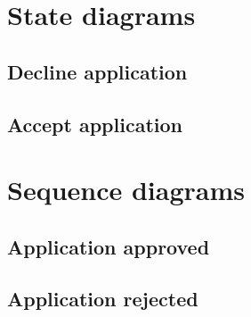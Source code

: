 \section{State diagrams}

\subsection{Decline application}

\subsection{Accept application}

\section{Sequence diagrams}

\subsection{Application approved}

\subsection{Application rejected}